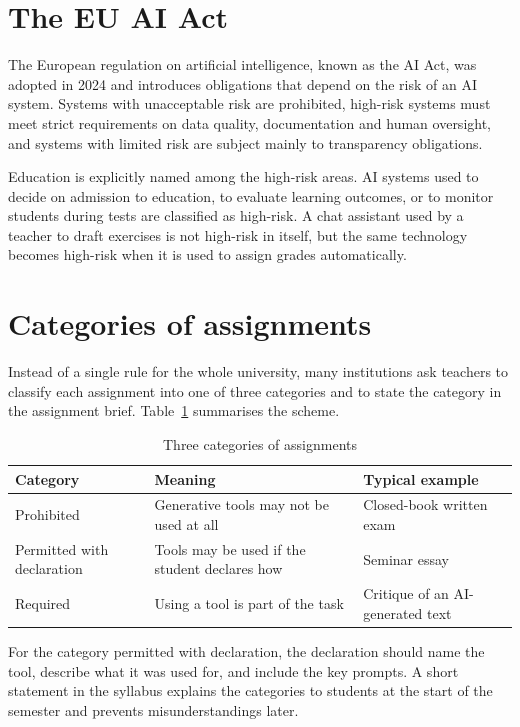 \documentclass[11pt,a4paper]{article}
\begin{document}
\section{The EU AI Act}

The European regulation on artificial intelligence, known as the AI Act, was
adopted in 2024 and introduces obligations that depend on the risk of an AI
system. Systems with unacceptable risk are prohibited, high-risk systems must
meet strict requirements on data quality, documentation and human oversight,
and systems with limited risk are subject mainly to transparency obligations.

Education is explicitly named among the high-risk areas. AI systems used to
decide on admission to education, to evaluate learning outcomes, or to
monitor students during tests are classified as high-risk. A chat assistant
used by a teacher to draft exercises is not high-risk in itself, but the
same technology becomes high-risk when it is used to assign grades
automatically.

\section{Categories of assignments}

Instead of a single rule for the whole university, many institutions ask
teachers to classify each assignment into one of three categories and to
state the category in the assignment brief. Table~\ref{tab:categories}
summarises the scheme.

\begin{table}[h]
\centering
\begin{tabular}{>{\raggedright}p{3.2cm} >{\raggedright}p{5.6cm} >{\raggedright\arraybackslash}p{4.2cm}}
\toprule
Category & Meaning & Typical example \\
\midrule
Prohibited & Generative tools may not be used at all & Closed-book written exam \\
Permitted with declaration & Tools may be used if the student declares how & Seminar essay \\
Required & Using a tool is part of the task & Critique of an AI-generated text \\
\bottomrule
\end{tabular}
\caption{Three categories of assignments}
\label{tab:categories}
\end{table}

For the category permitted with declaration, the declaration should name the
tool, describe what it was used for, and include the key prompts. A short
statement in the syllabus explains the categories to students at the start
of the semester and prevents misunderstandings later.
\end{document}
